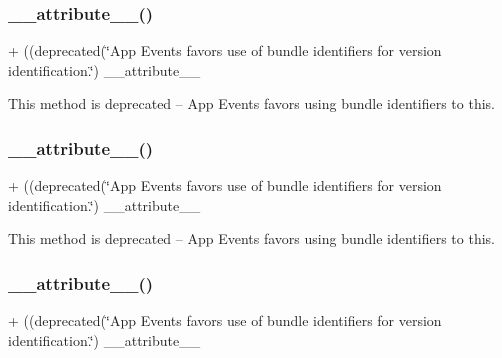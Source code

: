 \subsubsection{\texorpdfstring{\+\_\+\+\_\+attribute\+\_\+\+\_\+()}{\_\_attribute\_\_()}\hspace{0.1cm}{\footnotesize\ttfamily [3/5]}}
{\footnotesize\ttfamily + ((deprecated(\char`\"{}App Events favors use of bundle identifiers for version identification.\char`\"{}) \+\_\+\+\_\+attribute\+\_\+\+\_\+ \begin{DoxyParamCaption}{ }\end{DoxyParamCaption}}

This method is deprecated -- App Events favors using bundle identifiers to this. \mbox{\label{interfaceFBSettings_a2e999eddc513423b7071f27bc09589aa}} 
\subsubsection{\texorpdfstring{\+\_\+\+\_\+attribute\+\_\+\+\_\+()}{\_\_attribute\_\_()}\hspace{0.1cm}{\footnotesize\ttfamily [4/5]}}
{\footnotesize\ttfamily + ((deprecated(\char`\"{}App Events favors use of bundle identifiers for version identification.\char`\"{}) \+\_\+\+\_\+attribute\+\_\+\+\_\+ \begin{DoxyParamCaption}{ }\end{DoxyParamCaption}}

This method is deprecated -- App Events favors using bundle identifiers to this. \mbox{\label{interfaceFBSettings_a2e999eddc513423b7071f27bc09589aa}} 
\subsubsection{\texorpdfstring{\+\_\+\+\_\+attribute\+\_\+\+\_\+()}{\_\_attribute\_\_()}\hspace{0.1cm}{\footnotesize\ttfamily [5/5]}}
{\footnotesize\ttfamily + ((deprecated(\char`\"{}App Events favors use of bundle identifiers for version identification.\char`\"{}) \+\_\+\+\_\+attribute\+\_\+\+\_\+ \begin{DoxyParamCaption}{ }\end{DoxyParamCaption}}

